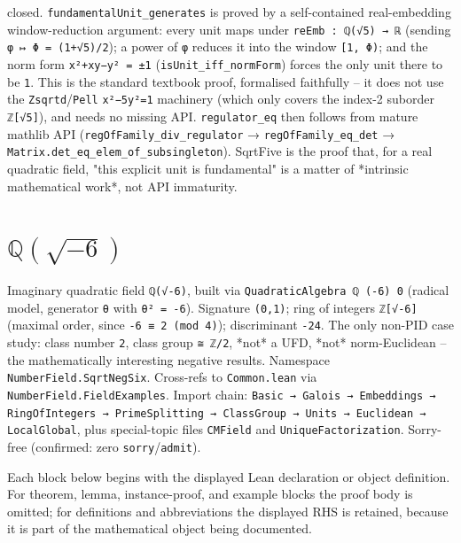 \documentclass[UTF8,a4paper,11pt,fontset=fandol]{ctexart}
\theoremstyle{definition}
\begin{document}
closed. \texttt{fundamentalUnit\_\allowbreak{}generates} is proved by a self-contained real-embedding window-reduction argument: every unit maps under \texttt{reEmb : ℚ(√5) → ℝ} (sending \texttt{φ ↦ Φ = (1+√5)/\allowbreak{}2}); a power of \texttt{φ} reduces it into the window \texttt{[1, Φ)}; and the norm form \texttt{x²+xy−y² = ±1} (\texttt{isUnit\_\allowbreak{}iff\_\allowbreak{}normForm}) forces the only unit there to be \texttt{1}. This is the standard textbook proof, formalised faithfully -- it does not use the \texttt{Zsqrtd}/\texttt{Pell} \texttt{x²−5y²=1} machinery (which only covers the index-2 suborder \texttt{ℤ[√5]}), and needs no missing API. \texttt{regulator\_\allowbreak{}eq} then follows from mature mathlib API (\texttt{regOfFamily\_\allowbreak{}div\_\allowbreak{}regulator} → \texttt{regOfFamily\_\allowbreak{}eq\_\allowbreak{}det} → \texttt{Matrix.\allowbreak{}det\_\allowbreak{}eq\_\allowbreak{}elem\_\allowbreak{}of\_\allowbreak{}subsingleton}). SqrtFive is the proof that, for a real quadratic field, "this explicit unit is fundamental" is a matter of *intrinsic mathematical work*, not API immaturity.


\section{\(\mathbb Q(\sqrt{-6})\)}

Imaginary quadratic field \texttt{ℚ(√-6)}, built via \texttt{QuadraticAlgebra ℚ (-6) 0} (radical model, generator \texttt{θ} with \texttt{θ² = -6}). Signature \texttt{(0,1)}; ring of integers \texttt{ℤ[√-6]} (maximal order, since \texttt{-6 ≡ 2 (mod 4)}); discriminant \texttt{-24}. The only non-PID case study: class number \texttt{2}, class group \texttt{≅ ℤ/\allowbreak{}2}, *not* a UFD, *not* norm-Euclidean -- the mathematically interesting negative results. Namespace \texttt{NumberField.\allowbreak{}SqrtNegSix}. Cross-refs to \texttt{Common.\allowbreak{}lean} via \texttt{NumberField.\allowbreak{}FieldExamples}. Import chain: \texttt{Basic → Galois → Embeddings → RingOfIntegers → PrimeSplitting → ClassGroup → Units → Euclidean → LocalGlobal}, plus special-topic files \texttt{CMField} and \texttt{UniqueFactorization}. Sorry-free (confirmed: zero \texttt{sorry}/\texttt{admit}).

Each block below begins with the displayed Lean declaration or object definition. For theorem, lemma, instance-proof, and example blocks the proof body is omitted; for definitions and abbreviations the displayed RHS is retained, because it is part of the mathematical object being documented.
\end{document}
